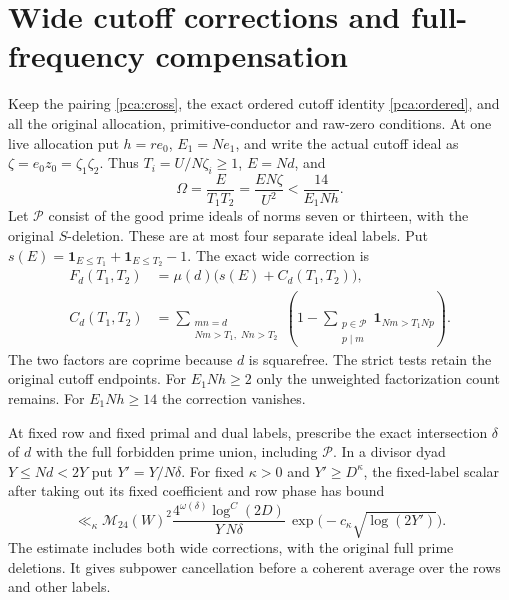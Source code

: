 \section{Wide cutoff corrections and full-frequency compensation}
\label{pca:wide-core}

Keep the pairing \eqref{pca:cross}, the exact ordered cutoff
identity \eqref{pca:ordered}, and all the original allocation,
primitive-conductor and raw-zero conditions. At one live
allocation put \(h=re_0\), \(E_1=Ne_1\), and write the
actual cutoff ideal as \(\zeta=e_0z_0=\zeta_1\zeta_2\).
Thus \(T_i=U/N\zeta_i\ge1\), \(E=Nd\), and
\[
 \Omega=\frac{E}{T_1T_2}=\frac{E N\zeta}{U^2}
                 <\frac{14}{E_1Nh}.
\]
Let \(\mathcal P\) consist of the good prime ideals of norms
seven or thirteen, with the original \(S\)-deletion. These
are at most four separate ideal labels. Put
\(s(E)=\mathbf1_{E\le T_1}+\mathbf1_{E\le T_2}-1\).
The exact wide correction is
\begin{equation}\label{pca:wide-factor}
 \begin{aligned}
 F_d(T_1,T_2)&=\mu(d)\bigl(s(E)+C_d(T_1,T_2)\bigr),\\
 C_d(T_1,T_2)&=
 \sum_{\substack{mn=d\\Nm>T_1,\;Nn>T_2}}
       \left(1-\sum_{\substack{p\in\mathcal P\\p\mid m}}
                  \mathbf1_{Nm>T_1Np}\right).
 \end{aligned}
\end{equation}
The two factors are coprime because \(d\) is squarefree.
The strict tests retain the original cutoff endpoints.
For \(E_1Nh\ge2\) only the unweighted factorization count
remains. For \(E_1Nh\ge14\) the correction vanishes.

At fixed row and fixed primal and dual labels, prescribe the
exact intersection \(\delta\) of \(d\) with the full forbidden
prime union, including \(\mathcal P\). In a divisor dyad
\(Y\le Nd<2Y\) put \(Y'=Y/N\delta\). For fixed \(\kappa>0\)
and \(Y'\ge D^\kappa\), the fixed-label scalar after taking
out its fixed coefficient and row phase has bound
\begin{equation}\label{pca:wide-scalar}
 \ll_\kappa \mathcal M_{24}(W)^2
 \frac{4^{\omega(\delta)}\log^C(2D)}{Y\,N\delta}\,
               \exp\!\bigl(-c_\kappa\sqrt{\log(2Y')}\bigr).
\end{equation}
The estimate includes both wide corrections, with the
original full prime deletions. It gives subpower cancellation
before a coherent average over the rows and other labels.

